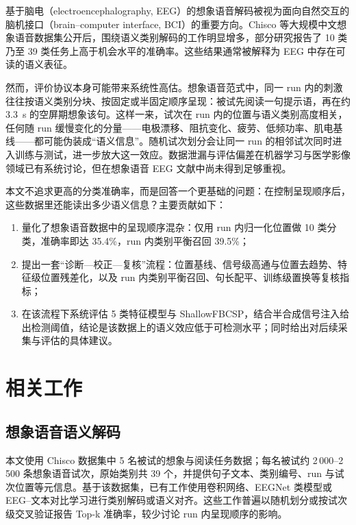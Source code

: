 \documentclass[twocolumn,10pt]{ctexart}
\begin{document}
基于脑电（electroencephalography, EEG）的想象语音解码被视为面向自然交互的脑机接口（brain--computer interface, BCI）的重要方向。Chisco 等大规模中文想象语音数据集公开后，围绕语义类别解码的工作明显增多，部分研究报告了 10 类乃至 39 类任务上高于机会水平的准确率\cite{chisco,semalign,eegtext}。这些结果通常被解释为 EEG 中存在可读的语义表征。

然而，评价协议本身可能带来系统性高估。想象语音范式中，同一 run 内的刺激往往按语义类别分块、按固定或半固定顺序呈现：被试先阅读一句提示语，再在约 3.3~s 的空屏期想象该句。这样一来，试次在 run 内的位置与语义类别高度相关，任何随 run 缓慢变化的分量——电极漂移、阻抗变化、疲劳、低频功率、肌电基线——都可能伪装成“语义信息”。随机试次划分会让同一 run 的相邻试次同时进入训练与测试，进一步放大这一效应。数据泄漏与评估偏差在机器学习与医学影像领域已有系统讨论\cite{leakage,mlfail}，但在想象语音 EEG 文献中尚未得到足够重视。

本文不追求更高的分类准确率，而是回答一个更基础的问题：在控制呈现顺序后，这些数据里还能读出多少语义信息？主要贡献如下：

\begin{enumerate}
\item 量化了想象语音数据中的呈现顺序混杂：仅用 run 内归一化位置做 10 类分类，准确率即达 35.4\%，run 内类别平衡召回 39.5\%；
\item 提出一套“诊断—校正—复核”流程：位置基线、信号级高通与位置去趋势、特征级位置残差化，以及 run 内类别平衡召回、句长配平、训练级置换等复核指标；
\item 在该流程下系统评估 5 类特征模型与 ShallowFBCSP，结合半合成信号注入给出检测阈值，结论是该数据上的语义效应低于可检测水平；同时给出对后续采集与评估的具体建议。
\end{enumerate}

\section{相关工作}

\subsection{想象语音语义解码}

本文使用 Chisco 数据集中 5 名被试的想象与阅读任务数据；每名被试约 2\,000--2\,500 条想象语音试次，原始类别共 39 个，并提供句子文本、类别编号、run 与试次位置等元信息\cite{chisco}。基于该数据集，已有工作使用卷积网络、EEGNet 类模型或 EEG--文本对比学习进行类别解码或语义对齐\cite{semalign,eegtext}。这些工作普遍以随机划分或按试次级交叉验证报告 Top-k 准确率，较少讨论 run 内呈现顺序的影响。
\end{document}
